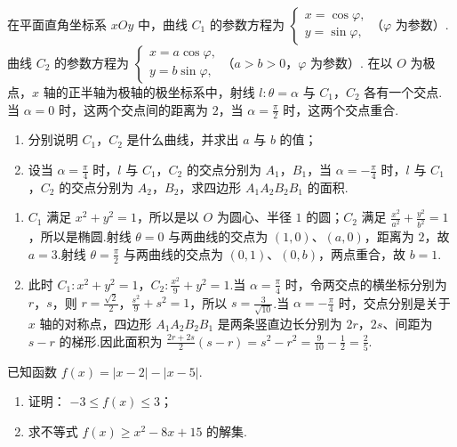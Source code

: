 \begin{problem}
在平面直角坐标系 \(xOy\) 中，曲线 \(C_{1}\) 的参数方程为 \(\begin{cases}
x = \cos \varphi,\\
y = \sin \varphi,
\end{cases}\)（\(\varphi\) 为参数）. 曲线 \(C_{2}\) 的参数方程为 \(\begin{cases}
x = a\cos \varphi,\\
y = b\sin \varphi,
\end{cases}\)（\(a > b > 0\)，\(\varphi\) 为参数）. 在以 \(O\) 为极点，\(x\) 轴的正半轴为极轴的极坐标系中，射线 \(l: \theta = \alpha\) 与 \(C_{1}\)，\(C_{2}\) 各有一个交点. 当 \(\alpha = 0\) 时，这两个交点间的距离为 \(2\)，当 \(\alpha = \frac{\pi}{2}\) 时，这两个交点重合.
\begin{enumerate}
\item 分别说明 \(C_{1}\)，\(C_{2}\) 是什么曲线，并求出 \(a\) 与 \(b\) 的值；
\item 设当 \(\alpha = \frac{\pi}{4}\) 时，\(l\) 与 \(C_{1}\)，\(C_{2}\) 的交点分别为 \(A_{1}\)，\(B_{1}\)，当 \(\alpha = -\frac{\pi}{4}\) 时，\(l\) 与 \(C_{1}\)，\(C_{2}\) 的交点分别为 \(A_{2}\)，\(B_{2}\)，求四边形 \(A_{1}A_{2}B_{2}B_{1}\) 的面积.
\end{enumerate}
\end{problem}

\begin{solution}
\begin{enumerate}
\item \(C_1\) 满足 \(x^2+y^2=1\)，所以是以 \(O\) 为圆心、半径 \(1\) 的圆；\(C_2\) 满足
\(\displaystyle \frac{x^2}{a^2}+\frac{y^2}{b^2}=1\)，所以是椭圆.射线 \(\theta=0\) 与两曲线的交点为 \((1,0)\)、\((a,0)\)，距离为 \(2\)，故 \(a=3\).射线 \(\theta=\tfrac{\pi}{2}\) 与两曲线的交点为 \((0,1)\)、\((0,b)\)，两点重合，故 \(b=1\).
\item 此时 \(C_1:x^2+y^2=1\)，\(C_2:\tfrac{x^2}{9}+y^2=1\).当 \(\alpha=\tfrac{\pi}{4}\) 时，令两交点的横坐标分别为 \(r\)，\(s\)，则
\(\displaystyle r=\frac{\sqrt2}{2}\)，\(\frac{s^2}{9}+s^2=1\)，所以 \(\displaystyle s=\frac{3}{\sqrt{10}}\).当 \(\alpha=-\tfrac{\pi}{4}\) 时，交点分别是关于 \(x\) 轴的对称点，四边形 \(A_1A_2B_2B_1\) 是两条竖直边长分别为 \(2r\)，\(2s\)、间距为 \(s-r\) 的梯形.因此面积为
\(\displaystyle \frac{2r+2s}{2}(s-r)=s^2-r^2=\frac9{10}-\frac12=\frac25\).
\end{enumerate}
\end{solution}

\begin{problem}
已知函数 \(f(x) = |x - 2| - |x - 5|\).
\begin{enumerate}
\item 证明： \(-3 \leqslant f(x) \leqslant 3\)；
\item 求不等式 \(f(x) \geqslant x^{2} - 8x + 15\) 的解集.
\end{enumerate}
\end{problem}

